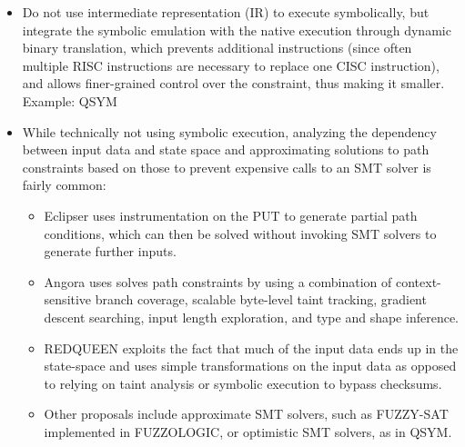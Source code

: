 \documentclass{article}
\begin{document}
\begin{multicols}{2}
\begin{itemize}
        \item Do not use intermediate representation (IR) to execute symbolically, but integrate the symbolic emulation with the native execution through dynamic binary translation, which prevents additional instructions (since often multiple RISC instructions are necessary to replace one CISC instruction), and allows finer-grained control over the constraint, thus making it smaller. Example: QSYM\cite{QSYM}
        \item While technically not using symbolic execution, analyzing the dependency between input data and state space and approximating solutions to path constraints based on those to prevent expensive calls to an SMT solver is fairly common\cite{WEIZZ}:
              \begin{itemize}
                  \item Eclipser\cite{Eclipser} uses instrumentation on the PUT to generate partial path conditions, which can then be solved without invoking SMT solvers to generate further inputs.
                  \item Angora\cite{Angora} uses solves path constraints by using a combination of context-sensitive branch coverage, scalable byte-level taint tracking, gradient descent searching, input length exploration, and type and shape inference.
                  \item REDQUEEN\cite{REDQUEEN} exploits the fact that much of the input data ends up in the state-space and uses simple transformations on the input data as opposed to relying on taint analysis or symbolic execution to bypass checksums.
                  \item Other proposals include approximate SMT solvers, such as FUZZY-SAT implemented in FUZZOLOGIC\cite{FUZZOLIC}, or optimistic SMT solvers, as in QSYM\cite{QSYM}.
              \end{itemize}
    \end{itemize}


\end{multicols}
\end{document}
